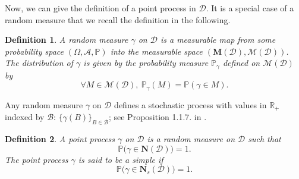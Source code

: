 \documentclass[twoside,11pt]{book}
\newtheorem{definition}{Definition}
\numberwithin{theorem}{chapter}
\numberwithin{definition}{chapter}
\numberwithin{proposition}{chapter}
\numberwithin{corollary}{chapter}
\numberwithin{example}{chapter}
\numberwithin{lemma}{chapter}
\numberwithin{assumption}{chapter}
\begin{document}

Now, we can give the definition of a point process in $\mathcal{D}$. It is a special case of a random measure that we recall the definition in the following. 





\begin{definition}
A random measure $\gamma$ on $\mathcal{D}$ is a measurable map from some probability space $(\Omega, \mathcal{A}, \mathbb{P})$  into the measurable space $(\mathbf{M}(\mathcal{D}), \mathcal{M}(\mathcal{D}))$. The distribution of $\gamma$ is given by the probability measure $\mathbb{P}_{\gamma}$ defined on $\mathcal{M}(\mathcal{D})$ by
\begin{equation}
\forall M \in \mathcal{M}(\mathcal{D}), \:\mathbb{P}_{\gamma}(M) = \mathbb{P}(\gamma \in M).
\end{equation}

\end{definition}

Any random measure $\gamma$ on $\mathcal{D}$ defines a stochastic process with values in $\mathbb{R}_{+}$ indexed by $\mathcal{B}$: $\{\gamma(B)\}_{B \in \mathcal{B}}$; see Proposition  1.1.7. in \citep*{BaBlKa20}.

\begin{definition}
A point process $\gamma$ on $\mathcal{D}$ is a random measure on $\mathcal{D}$ such that
\begin{equation}
\mathbb{P} \big(\gamma \in \mathbf{N} (\mathcal{D}) \big) = 1.
\end{equation}
The point process $\gamma$ is said to be a simple if 
\begin{equation}
\mathbb{P}\big( \gamma \in \mathbf{N}_{s}(\mathcal{D})\big) = 1.
\end{equation}

\end{definition}
\end{document}
